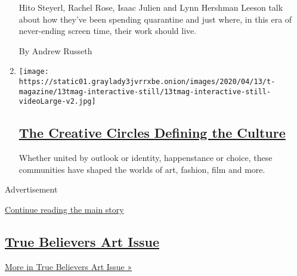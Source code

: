 \begin{enumerate}
  Hito Steyerl, Rachel Rose, Isaac Julien and Lynn Hershman Leeson talk
  about how they've been spending quarantine and just where, in this era
  of never-ending screen time, their work should live.

  By Andrew Russeth
\item
  \texttt{[image: https://static01.graylady3jvrrxbe.onion/images/2020/04/13/t-magazine/13tmag-interactive-still/13tmag-interactive-still-videoLarge-v2.jpg]}

  \hypertarget{the-creative-circles-defining-the-culture}{%
  \subsection{\texorpdfstring{\href{/interactive/2020/04/13/t-magazine/culture-issue-2020.html}{The
  Creative Circles Defining the
  Culture}}{The Creative Circles Defining the Culture}}\label{the-creative-circles-defining-the-culture}}

  Whether united by outlook or identity, happenstance or choice, these
  communities have shaped the worlds of art, fashion, film and more.
\end{enumerate}

Advertisement

\protect\hyperlink{after-mid1}{Continue reading the main story}

\hypertarget{true-believers-art-issue}{%
\subsection{\texorpdfstring{\href{/issue/t-magazine/2020/07/02/true-believers-art-issue}{True
Believers Art
Issue}}{True Believers Art Issue}}\label{true-believers-art-issue}}

\href{/issue/t-magazine/2020/07/02/true-believers-art-issue}{More in
True Believers Art Issue »}

